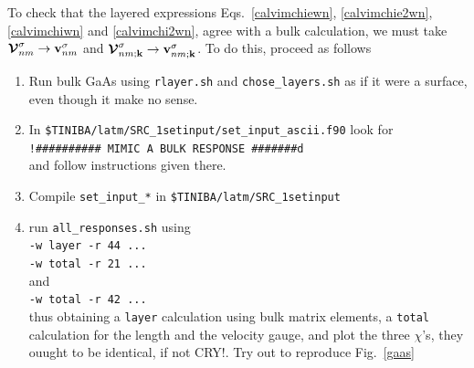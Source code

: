 To check that the layered expressions
Eqs.~\eqref{calvimchiewn}, \eqref{calvimchie2wn}, \eqref{calvimchiwn}
 and \eqref{calvimchi2wn}, agree with a bulk calculation, we must
 take 
$\boldsymbol{\mathcal{\cal V}}^\sigma_{nm}\to\mathbf{v}^\sigma_{nm}$
and
$\boldsymbol{\mathcal{\cal V}}^\sigma_{nm;\mathbf{k}}\to\mathbf{v}^\sigma_{nm;\mathbf{k}}$. To do this, proceed as
follows
\begin{enumerate}
\item Run bulk GaAs using  \verb=rlayer.sh= and \verb=chose_layers.sh=
as if it were a surface, even though it make no sense.
\item In \verb=$TINIBA/latm/SRC_1setinput/set_input_ascii.f90= look for\\
\verb=!########## MIMIC A BULK RESPONSE #######d=\\
and follow instructions given there.
\item Compile \verb=set_input_*= in \verb=$TINIBA/latm/SRC_1setinput=
\item run \verb=all_responses.sh= using\\ 
\verb=-w layer -r 44 ...=\\
\verb=-w total -r 21 ...=\\
and \\
\verb=-w total -r 42 ...=\\
thus obtaining a \verb=layer= calculation using bulk matrix elements, a
\verb=total= calculation for the length  and the velocity gauge, and plot the
three $\chi$'s, they ouught to be identical, if not CRY!. Try out to
reproduce Fig.~\ref{gaas}  
\end{enumerate}
